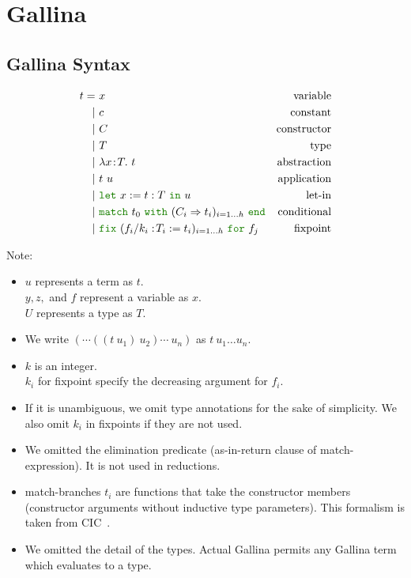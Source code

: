 \documentclass[a4paper,fleqn]{article}
\def\gallina{\textrm{Gallina}}
\newcommand{\kwlet}{\mbox{\color{mygreen}\ttfamily let}}
\newcommand{\kwin}{\mbox{\color{mygreen}\ttfamily in}}
\newcommand{\kwmatch}{\mbox{\color{mygreen}\ttfamily match}}
\newcommand{\kwas}{\mbox{\color{mygreen}\ttfamily as}}
\newcommand{\kwreturn}{\mbox{\color{mygreen}\ttfamily return}}
\newcommand{\kwwith}{\mbox{\color{mygreen}\ttfamily with}}
\newcommand{\kwend}{\mbox{\color{mygreen}\ttfamily end}}
\newcommand{\kwfix}{\mbox{\color{mygreen}\ttfamily fix}}
\newcommand{\kwfor}{\mbox{\color{mygreen}\ttfamily for}}
\newcommand{\lamT}[3]{\lambda #1\!:\!#2.~#3}
\newcommand{\letin}[3]{\kwlet~#1:=#2~\kwin~#3}
\newcommand{\match}[4]{\kwmatch~#1~\kwwith~(#2 \Rightarrow #3)_{#4}~\kwend}
\newcommand{\fixT}[5]{\kwfix~(#1:\!#2 := #3)_{#4}~\kwfor~#5}
\begin{document}
\section{\gallina{}}\label{sec:gallina}
\subsection{\gallina{} Syntax}\label{sec:gallina-syntax}

\begin{align*}
  t =&\ x & \text{variable} \\
    |&\ c & \text{constant} \\
    |&\ C & \text{constructor} \\
    |&\ T & \text{type} \\
    |&\ \lamT{x}{T}{t}        & \text{abstraction} \\
    |&\ t~u                   & \text{application} \\
    |&\ \letin{x}{t:T}{u}     & \text{let-in} \\
    |&\ \match{t_0}{C_i}{t_i}{i=1\dots h} & \text{conditional} \\
    |&\ \fixT{f_i/k_i}{T_i}{t_i}{i=1\dots h}{f_j} & \text{fixpoint}
\end{align*}
\raggedright
{\small Note:
\begin{itemize}
  \item $u$ represents a term as $t$. \\ $y, z,$ and $f$ represent a variable as $x$. \\ $U$ represents a type as $T$.
  \item We write $(\cdots((t~u_1)~u_2)\cdots~u_n)$ as $t~u_1\dots u_n$.
  \item $k$ is an integer. \\ $k_i$ for fixpoint specify the decreasing argument for $f_i$.
  \item If it is unambiguous, we omit type annotations for the sake of simplicity.  We also omit $k_i$ in fixpoints if they are not used.
  \item We omitted the elimination predicate (\kwas-\kwin-\kwreturn{} clause of \kwmatch-expression).  It is not used in reductions.
  \item \kwmatch-branches $t_i$ are functions that take the constructor members (constructor arguments without inductive type parameters).
    This formalism is taken from CIC~\cite{coqrefman8.12.0}.
  \item We omitted the detail of the types.  Actual \gallina{} permits any \gallina{} term which evaluates to a type.
\end{itemize}}
\end{document}
